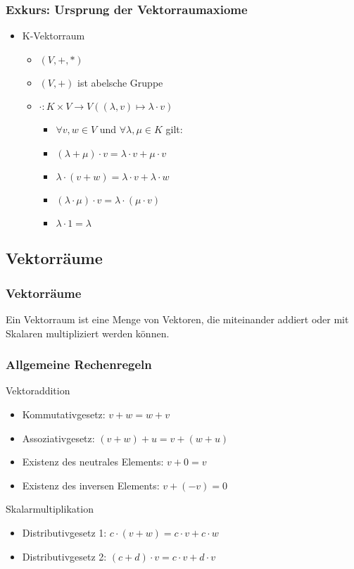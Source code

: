 \begin{frame}
    \frametitle{Exkurs: Ursprung der Vektorraumaxiome}
    \begin{itemize}
        \item K-Vektorraum
        \begin{itemize}
            \item $(V,+,*)$
            \item $(V,+)$ ist abelsche Gruppe
            \item $\cdot: K \times V \rightarrow V ((\lambda, v) \mapsto \lambda \cdot v)$
            \begin{itemize}
                \item $\forall v,w \in V$ und $\forall \lambda, \mu \in K$ gilt:
                \item $(\lambda + \mu) \cdot v = \lambda \cdot v + \mu \cdot v$
                \item $\lambda \cdot (v + w) = \lambda \cdot v + \lambda \cdot w$
                \item $(\lambda \cdot \mu) \cdot v = \lambda \cdot (\mu \cdot v)$
                \item $\lambda \cdot 1 = \lambda$
            \end{itemize}
        \end{itemize}
    \end{itemize}
\end{frame}

\subsection{Vektorräume}
\begin{frame}
    \frametitle{Vektorräume}
    Ein Vektorraum ist eine Menge von Vektoren, die miteinander addiert oder mit Skalaren multipliziert werden können.
\end{frame}

\begin{frame}
    \frametitle{Allgemeine Rechenregeln}
    Vektoraddition
    \begin{itemize}
        \item Kommutativgesetz: $v + w = w + v$
        \item Assoziativgesetz: $(v + w) + u = v + (w + u)$
        \item Existenz des neutrales Elements: $v + 0 = v$
        \item Existenz des inversen Elements: $v + (-v) = 0$
    \end{itemize}

    Skalarmultiplikation
    \begin{itemize}
        \item Distributivgesetz 1: $c \cdot (v + w) = c \cdot v + c \cdot w$
        \item Distributivgesetz 2: $(c + d) \cdot v = c \cdot v + d \cdot v$
    \end{itemize}
\end{frame}
